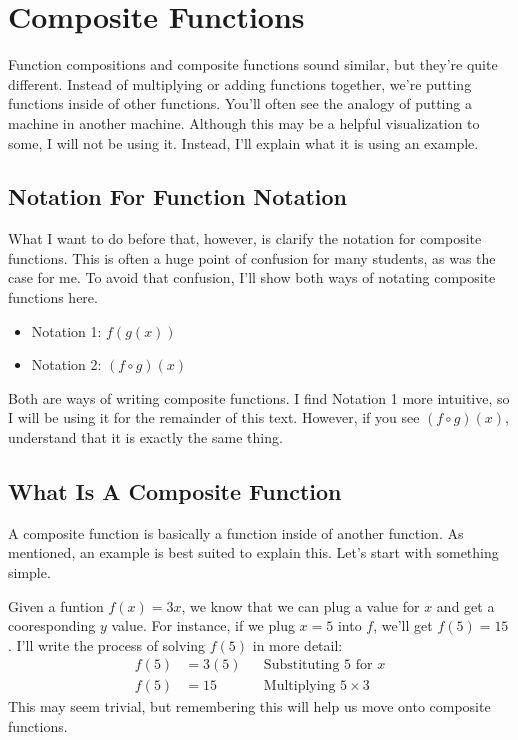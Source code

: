 \clearpage
\chapter{Composite Functions}
Function compositions and composite functions sound similar, but they're quite different. Instead of multiplying or adding functions together, we're putting functions inside of other functions. You'll often see the analogy of putting a machine in another machine. Although this may be a helpful visualization to some, I will not be using it. Instead, I'll explain what it is using an example.

\section{Notation For Function Notation}
What I want to do before that, however, is clarify the notation for composite functions. This is often a huge point of confusion for many students, as was the case for me. To avoid that confusion, I'll show both ways of notating composite functions here.

\begin{itemize}
    \item Notation 1: $f(g(x))$
    \item Notation 2: $(f \circ g)(x)$
\end{itemize}

Both are ways of writing composite functions. I find Notation 1 more intuitive, so I will be using it for the remainder of this text. However, if you see $(f \circ g)(x)$, understand that it is exactly the same thing.
\clearpage
\section{What Is A Composite Function}
A composite function is basically a function inside of another function. As mentioned, an example is best suited to explain this. Let's start with something simple.

Given a funtion $f(x) = 3x$, we know that we can plug a value for $x$ and get a cooresponding $y$ value. For instance, if we plug $x = 5$ into $f$, we'll get $f(5) = 15$. I'll write the process of solving $f(5)$ in more detail:
\begin{align*}
    f(5) &= 3(5) && \text{Substituting $5$ for $x$}\\
    f(5) &= 15 && \text{Multiplying $5 \times 3$}
\end{align*}
This may seem trivial, but remembering this will help us move onto composite functions.

